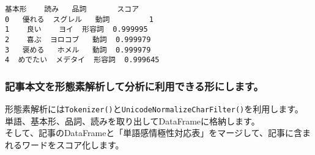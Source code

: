 \documentclass[11pt]{article}
\makeatletter
\newcommand{\boxspacing}{\kern\kvtcb@left@rule\kern\kvtcb@boxsep}
\newcommand{\prompt}[4]{
        \ttfamily\llap{{\color{#2}[#3]:\hspace{3pt}#4}}\vspace{-\baselineskip}
    }
\makeatother
\begin{document}
            \begin{tcolorbox}[breakable, size=fbox, boxrule=.5pt, pad at break*=1mm, opacityfill=0]
\prompt{Out}{outcolor}{9}{\boxspacing}
\begin{Verbatim}[commandchars=\\\{\}]
    基本形    読み   品詞       スコア
0   優れる  スグレル   動詞         1
1    良い    ヨイ  形容詞  0.999995
2    喜ぶ  ヨロコブ   動詞  0.999979
3   褒める   ホメル   動詞  0.999979
4  めでたい  メデタイ  形容詞  0.999645
\end{Verbatim}
\end{tcolorbox}
        
    \hypertarget{ux8a18ux4e8bux672cux6587ux3092ux5f62ux614bux7d20ux89e3ux6790ux3057ux3066ux5206ux6790ux306bux5229ux7528ux3067ux304dux308bux5f62ux306bux3057ux307eux3059}{%
\subsubsection{記事本文を形態素解析して分析に利用できる形にします。}\label{ux8a18ux4e8bux672cux6587ux3092ux5f62ux614bux7d20ux89e3ux6790ux3057ux3066ux5206ux6790ux306bux5229ux7528ux3067ux304dux308bux5f62ux306bux3057ux307eux3059}}

形態素解析には\texttt{Tokenizer()}と\texttt{UnicodeNormalizeCharFilter()}を利用します。\\
単語、基本形、品詞、読みを取り出してDataFrameに格納します。\\
そして、記事のDataFrameと「単語感情極性対応表」をマージして、記事に含まれるワードをスコア化します。
\end{document}
